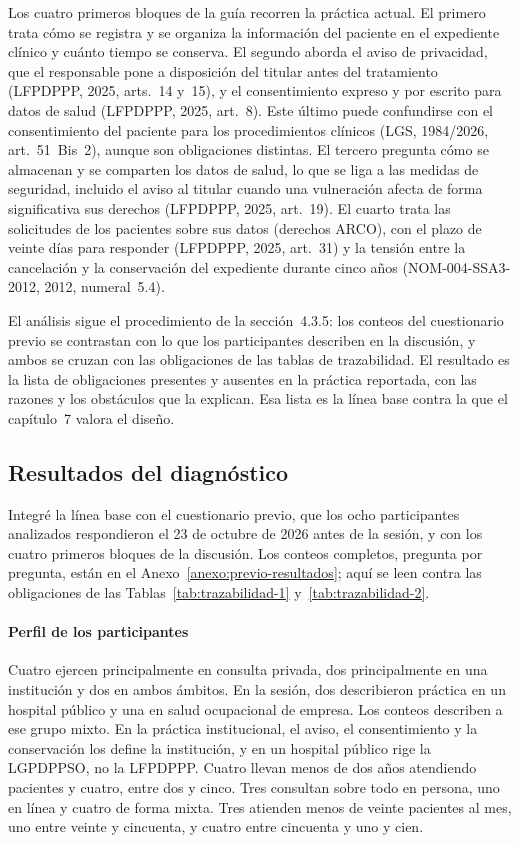 \documentclass[12pt, a4paper]{article}
\begin{document}
Los cuatro primeros bloques de la guía recorren la práctica actual. El
primero trata cómo se registra y se organiza la información del paciente
en el expediente clínico y cuánto tiempo se conserva. El segundo aborda
el aviso de privacidad, que el responsable pone a disposición del
titular antes del tratamiento (LFPDPPP, 2025, arts.~14 y~15), y el
consentimiento expreso y por escrito para datos de salud (LFPDPPP, 2025,
art.~8). Este último puede confundirse con el
consentimiento del paciente para los procedimientos clínicos (LGS,
1984/2026, art.~51~Bis~2), aunque son
obligaciones distintas. El tercero pregunta cómo se almacenan y se
comparten los datos de salud, lo que se liga a las medidas de seguridad,
incluido el aviso al titular cuando una vulneración afecta de forma
significativa sus derechos (LFPDPPP, 2025, art.~19). El cuarto trata las
solicitudes de los pacientes sobre sus datos (derechos ARCO), con el plazo de
veinte días para responder (LFPDPPP, 2025, art.~31) y la tensión entre
la cancelación y la conservación del expediente durante cinco años
(NOM-004-SSA3-2012, 2012, numeral~5.4).
 
El análisis sigue el procedimiento de la sección~4.3.5: los conteos del
cuestionario previo se contrastan con lo que los participantes describen en
la discusión, y ambos se cruzan con las obligaciones de las tablas de
trazabilidad. El resultado es la lista de obligaciones presentes y
ausentes en la práctica reportada, con las razones y los obstáculos
que la explican. Esa lista es la línea base contra la que el capítulo~7 valora el diseño.
 
\subsection{Resultados del diagnóstico}
 
Integré la línea base con el cuestionario previo, que los ocho
participantes analizados respondieron el 23 de octubre de 2026 antes de
la sesión, y con los cuatro primeros bloques de la discusión. Los
conteos completos, pregunta por pregunta, están en el
Anexo~\ref{anexo:previo-resultados}; aquí se leen contra las
obligaciones de las Tablas~\ref{tab:trazabilidad-1}
y~\ref{tab:trazabilidad-2}.
 
\paragraph{Perfil de los participantes}
Cuatro ejercen principalmente en consulta privada, dos principalmente
en una institución y dos en ambos ámbitos. En la sesión, dos describieron práctica en un hospital
público y una en salud ocupacional de empresa. Los conteos describen a ese grupo mixto. En la práctica institucional, el aviso, el consentimiento y la conservación los define la institución, y en un hospital público rige la LGPDPPSO, no la LFPDPPP. Cuatro llevan menos de
dos años atendiendo pacientes y cuatro, entre dos y cinco. Tres
consultan sobre todo en persona, uno en línea y cuatro de forma mixta.
Tres atienden menos de veinte pacientes al mes, uno entre veinte y
cincuenta, y cuatro entre cincuenta y uno y cien.
 
\end{document}
